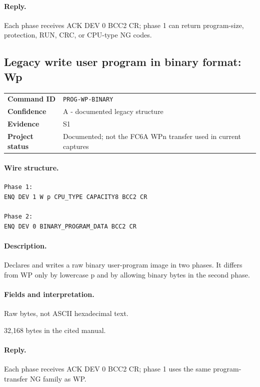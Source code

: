 \documentclass[10pt,letterpaper]{article}
\begin{document}
\paragraph{Reply.} Each phase receives ACK DEV 0 BCC2 CR; phase 1 can return program-size, protection, RUN, CRC, or CPU-type NG codes.

\subsection{Legacy write user program in binary format: Wp}
\begin{tabularx}{\textwidth}{@{}>{\bfseries}p{2.8cm}X@{}}
Command ID & \texttt{PROG-WP-BINARY} \\
Confidence & A - documented legacy structure \\
Evidence & S1 \\
Project status & Documented; not the FC6A WPn transfer used in current captures \\
\end{tabularx}
\vspace{0.35em}
\paragraph{Wire structure.}
\begin{Verbatim}[breaklines=true,breakanywhere=true,fontsize=\small]
Phase 1:
ENQ DEV 1 W p CPU_TYPE CAPACITY8 BCC2 CR

Phase 2:
ENQ DEV 0 BINARY_PROGRAM_DATA BCC2 CR
\end{Verbatim}
\paragraph{Description.} Declares and writes a raw binary user-program image in two phases. It differs from WP only by lowercase p and by allowing binary bytes in the second phase.
\paragraph{Fields and interpretation.}
\begin{description}[style=nextline,leftmargin=3.2cm,labelwidth=3.0cm,font=\normalfont\bfseries]
\item[BINARY\_PROGRAM\_DATA] Raw bytes, not ASCII hexadecimal text.
\item[Legacy maximum] 32,168 bytes in the cited manual.
\end{description}
\paragraph{Reply.} Each phase receives ACK DEV 0 BCC2 CR; phase 1 uses the same program-transfer NG family as WP.
\end{document}
